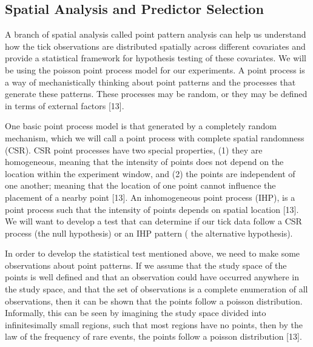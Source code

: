 \subsection{Spatial Analysis and Predictor Selection}
\noindent A branch of spatial analysis called point pattern analysis can help us understand how the tick observations are distributed spatially across different covariates and provide a statistical framework for hypothesis testing of these covariates. We will be using the poisson point process model for our experiments. A point process is a way of mechanistically thinking about point patterns and the processes that generate these patterns. These processes may be random, or they may be defined in terms of external factors [13]. \newline

\noindent One basic point process model is that generated by a completely random mechanism, which we will call a point process with complete spatial randomness (CSR). CSR point processes have two special properties, (1) they are homogeneous, meaning that the intensity of points does not depend on the location within the experiment window, and (2) the points are independent of one another; meaning that the location of one point cannot influence the placement of a nearby point [13]. An inhomogeneous point process (IHP), is a point process such that the intensity of points depends on spatial location [13]. We will want to develop a test that can determine if our tick data follow a CSR process (the null hypothesis) or an IHP pattern ( the alternative hypothesis). \newline 

\noindent In order to develop the statistical test mentioned above, we need to make some observations about point patterns. If we assume that the study space of the points is well defined and that an observation could have occurred anywhere in the study space, and that the set of observations is a complete enumeration of all observations, then it can be shown that the points follow a poisson distribution. Informally, this can be seen by imagining the study space divided into infinitesimally small regions, such that most regions have no points, then by the law of the frequency of rare events, the points follow a poisson distribution [13].  \newline

